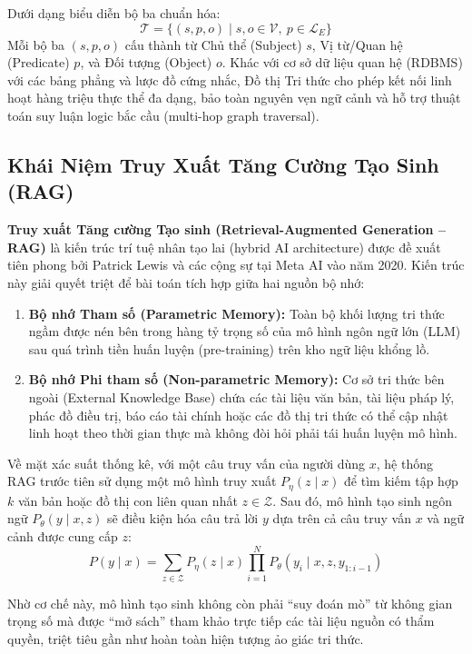 \documentclass[12pt,a4paper]{report}
\begin{document}
Dưới dạng biểu diễn bộ ba chuẩn hóa:
\begin{equation}
    \mathcal{T} = \{ (s, p, o) \mid s, o \in \mathcal{V}, \ p \in \mathcal{L}_E \}
\end{equation}
Mỗi bộ ba $(s, p, o)$ cấu thành từ Chủ thể (Subject) $s$, Vị từ/Quan hệ (Predicate) $p$, và Đối tượng (Object) $o$. Khác với cơ sở dữ liệu quan hệ (RDBMS) với các bảng phẳng và lược đồ cứng nhắc, Đồ thị Tri thức cho phép kết nối linh hoạt hàng triệu thực thể đa dạng, bảo toàn nguyên vẹn ngữ cảnh và hỗ trợ thuật toán suy luận logic bắc cầu (multi-hop graph traversal).

\subsection{Khái Niệm Truy Xuất Tăng Cường Tạo Sinh (RAG)}
\textbf{Truy xuất Tăng cường Tạo sinh (Retrieval-Augmented Generation -- RAG)} là kiến trúc trí tuệ nhân tạo lai (hybrid AI architecture) được đề xuất tiên phong bởi Patrick Lewis và các cộng sự tại Meta AI vào năm 2020. Kiến trúc này giải quyết triệt để bài toán tích hợp giữa hai nguồn bộ nhớ:
\begin{enumerate}
    \item \textbf{Bộ nhớ Tham số (Parametric Memory):} Toàn bộ khối lượng tri thức ngầm được nén bên trong hàng tỷ trọng số của mô hình ngôn ngữ lớn (LLM) sau quá trình tiền huấn luyện (pre-training) trên kho ngữ liệu khổng lồ.
    \item \textbf{Bộ nhớ Phi tham số (Non-parametric Memory):} Cơ sở tri thức bên ngoài (External Knowledge Base) chứa các tài liệu văn bản, tài liệu pháp lý, phác đồ điều trị, báo cáo tài chính hoặc các đồ thị tri thức có thể cập nhật linh hoạt theo thời gian thực mà không đòi hỏi phải tái huấn luyện mô hình.
\end{enumerate}

Về mặt xác suất thống kê, với một câu truy vấn của người dùng $x$, hệ thống RAG trước tiên sử dụng một mô hình truy xuất $P_{\eta}(z \mid x)$ để tìm kiếm tập hợp $k$ văn bản hoặc đồ thị con liên quan nhất $z \in \mathcal{Z}$. Sau đó, mô hình tạo sinh ngôn ngữ $P_{\theta}(y \mid x, z)$ sẽ điều kiện hóa câu trả lời $y$ dựa trên cả câu truy vấn $x$ và ngữ cảnh được cung cấp $z$:
\begin{equation}
    P(y \mid x) = \sum_{z \in \mathcal{Z}} P_{\eta}(z \mid x) \prod_{i=1}^{N} P_{\theta}(y_i \mid x, z, y_{1:i-1})
\end{equation}

Nhờ cơ chế này, mô hình tạo sinh không còn phải “suy đoán mò” từ không gian trọng số mà được “mở sách” tham khảo trực tiếp các tài liệu nguồn có thẩm quyền, triệt tiêu gần như hoàn toàn hiện tượng ảo giác tri thức.
\end{document}

